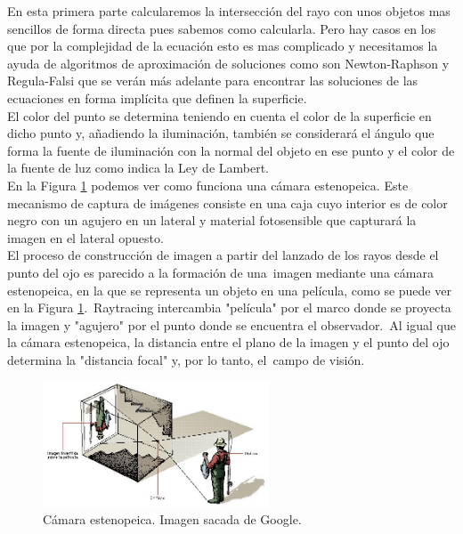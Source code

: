 En esta primera parte calcularemos la intersección del rayo con unos objetos mas sencillos de forma directa pues sabemos como calcularla. Pero hay casos en los que por la complejidad de la ecuación esto es mas complicado y necesitamos la ayuda de algoritmos de aproximación de soluciones como son Newton-Raphson y Regula-Falsi que se verán más adelante para encontrar las soluciones de las ecuaciones en forma implícita que definen la superficie.
${ }$\\
	
El color del punto se determina teniendo en cuenta el color de la superficie en dicho punto y, añadiendo la iluminación, también se considerará el ángulo que forma la fuente de iluminación con la normal del objeto en ese punto y el color de la fuente de luz como indica la Ley de Lambert.
	${ }$\\	


En la Figura \ref{fig:etiq_1} podemos ver como funciona una cámara estenopeica. Este mecanismo de captura de imágenes consiste en una caja cuyo interior es de color negro con un agujero en un lateral y material fotosensible que capturará la imagen en el lateral opuesto.
${ }$\\

El proceso de construcción de imagen a partir del lanzado de los rayos desde el punto del ojo es parecido a la formación de una imagen mediante una cámara estenopeica, en la que se representa un objeto en una película, como se puede ver en la Figura \ref{fig:etiq_1}. Raytracing intercambia "película" por el marco donde se proyecta la imagen y "agujero" por el punto donde se encuentra el observador. Al igual que la cámara estenopeica, la distancia entre el plano de la imagen y el punto del ojo determina la "distancia focal" y, por lo tanto, el campo de visión.
${ }$\\
	


\begin{figure}[h]
	\begin{center}
		\includegraphics[width=0.6\textwidth]{imagenes/camara-estenopeica.jpg}
	\end{center}
	\caption{Cámara estenopeica. Imagen sacada de Google.}
	\label{fig:etiq_1}
\end{figure}

